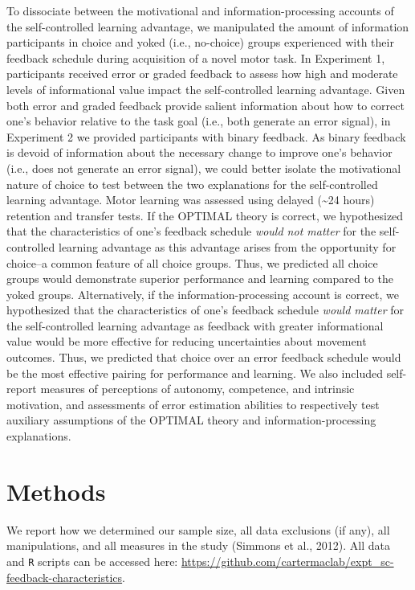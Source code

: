 \documentclass[
  man, donotrepeattitle,floatsintext]{apa7}
\begin{document}
To dissociate between the motivational and information-processing accounts of the self-controlled learning advantage, we manipulated the amount of information participants in choice and yoked (i.e., no-choice) groups experienced with their feedback schedule during acquisition of a novel motor task. In Experiment 1, participants received error or graded feedback to assess how high and moderate levels of informational value impact the self-controlled learning advantage. Given both error and graded feedback provide salient information about how to correct one's behavior relative to the task goal (i.e., both generate an error signal), in Experiment 2 we provided participants with binary feedback. As binary feedback is devoid of information about the necessary change to improve one's behavior (i.e., does not generate an error signal), we could better isolate the motivational nature of choice to test between the two explanations for the self-controlled learning advantage. Motor learning was assessed using delayed (\textasciitilde24 hours) retention and transfer tests. If the OPTIMAL theory is correct, we hypothesized that the characteristics of one's feedback schedule \emph{would not matter} for the self-controlled learning advantage as this advantage arises from the opportunity for choice--a common feature of all choice groups. Thus, we predicted all choice groups would demonstrate superior performance and learning compared to the yoked groups. Alternatively, if the information-processing account is correct, we hypothesized that the characteristics of one's feedback schedule \emph{would matter} for the self-controlled learning advantage as feedback with greater informational value would be more effective for reducing uncertainties about movement outcomes. Thus, we predicted that choice over an error feedback schedule would be the most effective pairing for performance and learning. We also included self-report measures of perceptions of autonomy, competence, and intrinsic motivation, and assessments of error estimation abilities to respectively test auxiliary assumptions of the OPTIMAL theory and information-processing explanations.

\hypertarget{methods}{%
\section{Methods}\label{methods}}

We report how we determined our sample size, all data exclusions (if any), all manipulations, and all measures in the study (Simmons et al., 2012). All data and \texttt{R} scripts can be accessed here: \url{https://github.com/cartermaclab/expt_sc-feedback-characteristics}.
\end{document}
